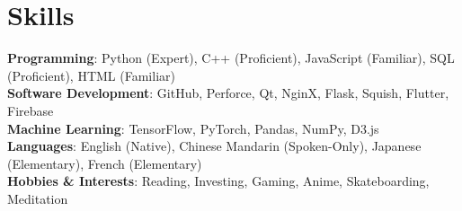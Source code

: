 \section{Skills}
 \begin{itemize}[leftmargin=0.5cm, label={}]
    \small{\item{
     \textbf{Programming}{: Python (Expert), C++ (Proficient), JavaScript (Familiar), SQL (Proficient), HTML (Familiar)} \\
     \textbf{Software Development}{: GitHub, Perforce, Qt, NginX, Flask, Squish, Flutter, Firebase} \\
     \textbf{Machine Learning}{: TensorFlow, PyTorch, Pandas, NumPy, D3.js} \\
     \textbf{Languages}{: English (Native), Chinese Mandarin (Spoken-Only), Japanese (Elementary), French (Elementary)} \\
     \textbf{Hobbies \& Interests}{: Reading, Investing, Gaming, Anime, Skateboarding, Meditation} \\
    }}
 \end{itemize}